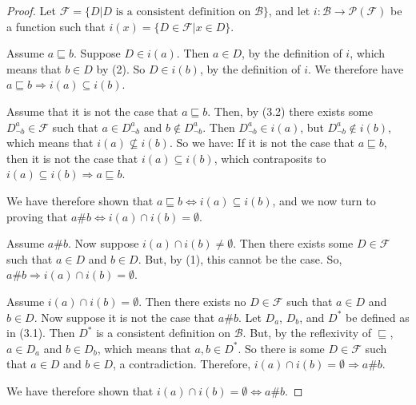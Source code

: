 \documentclass[12pt]{amsart}
\begin{document}
\begin{proof}
Let $\mathcal{F}=\{D\vert D\text{ is a consistent definition on }\mathcal{B}\}$, and let $i:\mathcal{B}\rightarrow\mathcal{P}(\mathcal{F})$ be a function such that $i(x)=\{D\in\mathcal{F}\vert x\in D\}$.

Assume $a\sqsubseteq b$. Suppose $D\in i(a)$. Then $a\in D$, by the definition of $i$, which means that $b\in D$ by (2). So $D\in i(b)$, by the definition of $i$. We therefore have $a\sqsubseteq b\Rightarrow i(a)\subseteq i(b)$.

Assume that it is not the case that $a\sqsubseteq b$. Then, by (3.2) there exists some $D^a_{\lnot b}\in\mathcal{F}$ such that $a\in D^a_{\lnot b}$ and $b\notin D^a_{\lnot b}$. Then $D^a_{\lnot b}\in i(a)$, but $D^a_{\lnot b}\notin i(b)$, which means that $i(a)\not\subseteq i(b)$. So we have: If it is not the case that $a\sqsubseteq b$, then it is not the case that $i(a)\subseteq i(b)$, which contraposits to $i(a)\subseteq i(b)\Rightarrow a\sqsubseteq b$.

We have therefore shown that $a\sqsubseteq b\Leftrightarrow i(a)\subseteq i(b)$, and we now turn to proving that $a\#b\Leftrightarrow i(a)\cap i(b)=\emptyset$.

Assume $a\#b$. Now suppose $i(a)\cap i(b)\neq\emptyset$. Then there exists some $D\in\mathcal{F}$ such that $a\in D$ and $b\in D$. But, by (1), this cannot be the case. So,  $a\#b\Rightarrow i(a)\cap i(b)=\emptyset$.

Assume $i(a)\cap i(b)=\emptyset$. Then there exists no $D\in\mathcal{F}$ such that $a\in D$ and $b\in D$. Now suppose it is not the case that $a\#b$. Let $D_a$, $D_b$, and $D^*$ be defined as in (3.1). Then  $D^*$ is a consistent definition on $\mathcal{B}$. But, by the reflexivity of $\sqsubseteq $, $a\in D_a$ and $b\in D_b$, which means that $a,b\in D^*$. So there is some $D\in\mathcal{F}$ such that $a\in D$ and $b\in D$, a contradiction. Therefore, $i(a)\cap i(b)=\emptyset\Rightarrow a\#b$.

We have therefore shown that $i(a)\cap i(b)=\emptyset\Leftrightarrow a\#b$.
\end{proof}
\end{document}
